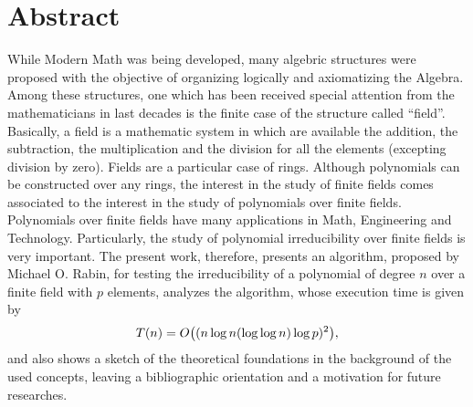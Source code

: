 

\chapter*{Abstract}

While Modern Math was being developed, many algebric structures were
proposed with the objective of organizing logically and axiomatizing the
Algebra. Among these structures, one which has been received special
attention from the mathematicians in last decades is the finite case of
the structure called ``field''. Basically, a field is a mathematic
system in which are available the addition, the subtraction, the
multiplication and the division for all the elements (excepting division
by zero). Fields are a particular case of rings. Although polynomials
can be constructed over any rings, the interest in the study of
finite fields comes associated to the interest in the study of
polynomials over finite fields. Polynomials over finite fields have many
applications in Math,
Engineering and Technology. Particularly, the study of polynomial
irreducibility over finite fields is very important. The present work,
therefore, presents an algorithm, proposed by  Michael O. Rabin, for
testing the irreducibility of a polynomial of degree $n$ over a finite
field with $p$ elements, analyzes
the algorithm, whose execution time is given by
\begin{equation*}
  T(n) = O\bigl((n\log{n}(\log{\log{n}})\log{p})^2\bigr)\mathrm{,}
\end{equation*}
 and also shows a sketch of the theoretical foundations in
the background of the used concepts, leaving a bibliographic orientation
and a motivation for future researches.



